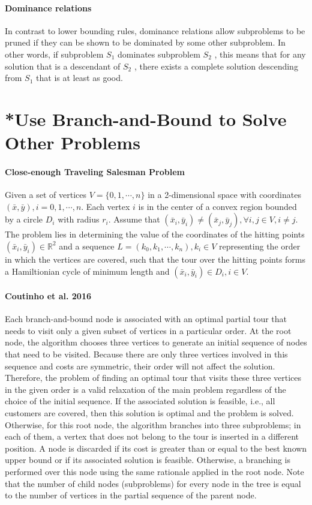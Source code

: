             \paragraph{Dominance relations}
                In contrast to lower bounding rules, dominance relations allow subproblems to be pruned if they can be shown to be dominated by some other subproblem. In other words, if subproblem $S_1$ dominates subproblem $S_2$ , this means that for any solution that is a descendant of $S_2$ , there exists a complete solution descending from $S_1$ that is at least as good. 

    \section{*Use Branch-and-Bound to Solve Other Problems}
        \paragraph{Close-enough Traveling Salesman Problem}
            Given a set of vertices $V = \{0, 1, \cdots, n\}$ in a 2-dimensional space with coordinates $(\bar{x}, \bar{y}), i = 0, 1, \cdots, n$. Each vertex $i$ is in the center of a convex region bounded by a circle $D_i$ with radius $r_i$. Assume that $(\bar{x}_i, \bar{y}_i) \neq (\bar{x}_j, \bar{y}_j), \forall i, j \in V, i \neq j$. The problem lies in determining the value of the coordinates of the hitting points $(\bar{x}_i, \bar{y}_i) \in \mathbb{R}^2$ and a sequence $L = (k_0, k_1, \cdots, k_n), k_i \in V$ representing the order in which the vertices are covered, such that the tour over the hitting points forms a Hamiltionian cycle of minimum length and $(\bar{x}_i, \bar{y}_i) \in D_i, i \in V$.

        \paragraph{Coutinho et al. 2016} Each branch-and-bound node is associated with an optimal partial tour that needs to visit only a given subset of vertices in a particular order. At the root node, the algorithm chooses three vertices to generate an initial sequence of nodes that need to be visited. Because there are only three vertices involved in this sequence and costs are symmetric, their order will not affect the solution. Therefore, the problem of finding an optimal tour that visits these three vertices in the given order is a valid relaxation of the main problem regardless of the choice of the initial sequence. If the associated solution is feasible, i.e., all customers are covered, then this solution is optimal and the problem is solved. Otherwise, for this root node, the algorithm branches into three subproblems; in each of them, a vertex that does not belong to the tour is inserted in a different position. A node is discarded if its cost is greater than or equal to the best known upper bound or if its associated solution is feasible. Otherwise, a branching is performed over this node using the same rationale applied in the root node. Note that the number of child nodes (subproblems) for every node in the tree is equal to the number of vertices in the partial sequence of the parent node. \citep{Coutinho2016}

